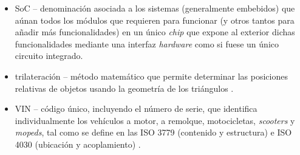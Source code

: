 \begin{itemize}
  \item \ac{SoC} -- denominación asociada a los sistemas (generalmente embebidos) que
        aúnan todos los módulos que requieren para funcionar (y otros tantos para añadir más
        funcionalidades) en un único \textit{chip} que expone al exterior dichas
        funcionalidades mediante una interfaz \textit{hardware} como si fuese un único
        circuito integrado.
  \item trilateración -- método matemático que permite determinar las posiciones
        relativas de objetos usando la geometría de los triángulos \cite{Trilateracion2021}.
  \item \ac{VIN} -- código único, incluyendo el número de serie, que identifica individualmente
        los vehículos a motor, a remolque, motocicletas, \textit{scooters} y \textit{mopeds},
        tal como se define en las ISO 3779 (contenido y estructura) e ISO 4030 (ubicación
        y acoplamiento) \cite{VehicleIdentificationNumber2022}.
\end{itemize}
